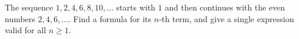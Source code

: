 The sequence $1,2,4,6,8,10,\dots$ starts with $1$ and then continues with the even numbers $2,4,6,\dots$. Find a formula for its $n$-th term, and give a single expression valid for all $n\ge1$.
